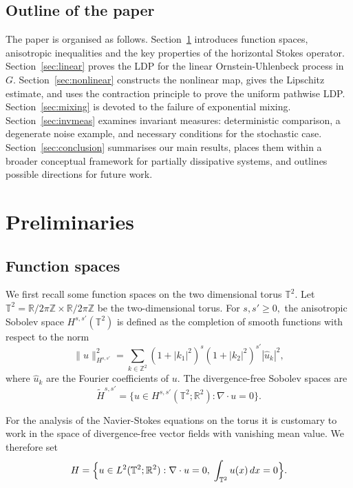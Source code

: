 \documentclass[11pt,a4paper,reqno]{amsart}
\theoremstyle{definition}
\begin{document}
\subsection{Outline of the paper}
The paper is organised as follows.  Section~\ref{sec:prelim} introduces function
spaces, anisotropic inequalities and the key  properties of the
horizontal Stokes operator.  Section~\ref{sec:linear} proves the LDP for the
linear Ornstein-Uhlenbeck process in $G$.  Section~\ref{sec:nonlinear} constructs the nonlinear map,
gives the Lipschitz estimate,
and uses the contraction principle to prove the uniform pathwise LDP.
Section~\ref{sec:mixing} is devoted to the failure of exponential mixing.
Section~\ref{sec:invmeas} examines invariant measures:
deterministic comparison, a degenerate noise example,
and necessary conditions for the stochastic case.
 Section~\ref{sec:conclusion} summarises our main results, places them
within a broader conceptual framework for partially dissipative systems,
and outlines possible directions for future work.




\section{Preliminaries}
\label{sec:prelim}


\subsection{Function spaces}
\label{sec:function-spaces}

We first recall some function spaces on the two dimensional torus $\mathbb{T}^2$.
Let $\mathbb{T}^2 = \mathbb{R}/2\pi\mathbb{Z} \times \mathbb{R}/2\pi\mathbb{Z}$ be the two-dimensional torus.
For $s,s'\ge 0,$ the anisotropic Sobolev space $H^{s,s'}(\mathbb{T}^2)$ is defined as the completion of smooth functions with respect to the norm
\[
  \|u\|_{H^{s,s'}}^2 = \sum_{k\in\mathbb{Z}^2} (1+|k_1|^2)^s(1+|k_2|^2)^{s'}|\hat u_k|^2,
\]
where $\hat u_k$ are the Fourier coefficients of $u$.
The divergence-free Sobolev spaces are
\[
  \widetilde H^{s,s'} = \bigl\{ u\in H^{s,s'}(\mathbb{T}^2;\mathbb{R}^2) : \nabla\cdot u = 0 \bigr\}.
\]

For the analysis of the Navier-Stokes equations on the torus it is customary to work in the space of divergence-free vector fields with vanishing mean value.  We therefore set
\begin{equation}\label{eq:Hdef}
  H = \Bigl\{ u\in L^2(\mathbb{T}^2;\mathbb{R}^2) : \nabla\cdot u = 0,\; \int_{\mathbb{T}^2} u(x)\,dx = 0 \Bigr\}.
\end{equation}
\end{document}
